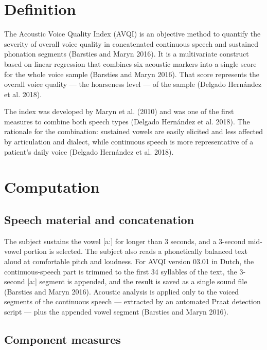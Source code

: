 \documentclass[
  english,
  letterpaper,
]{scrbook}
\begin{document}
\section{Definition}\label{definition-1}

The Acoustic Voice Quality Index (AVQI) is an objective method to
quantify the severity of overall voice quality in concatenated
continuous speech and sustained phonation segments (Barsties and Maryn
2016). It is a multivariate construct based on linear regression that
combines six acoustic markers into a single score for the whole voice
sample (Barsties and Maryn 2016). That score represents the overall
voice quality --- the hoarseness level --- of the sample (Delgado
Hernández et al. 2018).

The index was developed by Maryn et al. (2010) and was one of the first
measures to combine both speech types (Delgado Hernández et al. 2018).
The rationale for the combination: sustained vowels are easily elicited
and less affected by articulation and dialect, while continuous speech
is more representative of a patient's daily voice (Delgado Hernández et
al. 2018).

\section{Computation}\label{computation-1}

\subsection{Speech material and
concatenation}\label{speech-material-and-concatenation}

The subject sustains the vowel {[}a:{]} for longer than 3 seconds, and a
3-second mid-vowel portion is selected. The subject also reads a
phonetically balanced text aloud at comfortable pitch and loudness. For
AVQI version 03.01 in Dutch, the continuous-speech part is trimmed to
the first 34 syllables of the text, the 3-second {[}a:{]} segment is
appended, and the result is saved as a single sound file (Barsties and
Maryn 2016). Acoustic analysis is applied only to the voiced segments of
the continuous speech --- extracted by an automated Praat detection
script --- plus the appended vowel segment (Barsties and Maryn 2016).

\subsection{Component measures}\label{component-measures}
\end{document}
